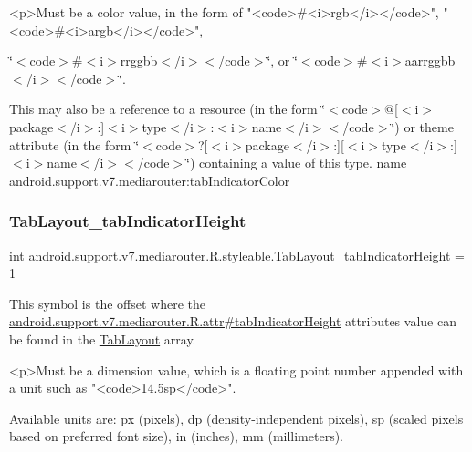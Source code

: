 \begin{DoxyVerb}      <p>Must be a color value, in the form of "<code>#<i>rgb</i></code>", "<code>#<i>argb</i></code>",
\end{DoxyVerb}
 \char`\"{}$<$code$>$\#$<$i$>$rrggbb$<$/i$>$$<$/code$>$\char`\"{}, or \char`\"{}$<$code$>$\#$<$i$>$aarrggbb$<$/i$>$$<$/code$>$\char`\"{}. 

This may also be a reference to a resource (in the form \char`\"{}$<$code$>$@\mbox{[}$<$i$>$package$<$/i$>$\+:\mbox{]}$<$i$>$type$<$/i$>$\+:$<$i$>$name$<$/i$>$$<$/code$>$\char`\"{}) or theme attribute (in the form \char`\"{}$<$code$>$?\mbox{[}$<$i$>$package$<$/i$>$\+:\mbox{]}\mbox{[}$<$i$>$type$<$/i$>$\+:\mbox{]}$<$i$>$name$<$/i$>$$<$/code$>$\char`\"{}) containing a value of this type.  name android.\+support.\+v7.\+mediarouter\+:tab\+Indicator\+Color \mbox{\label{classandroid_1_1support_1_1v7_1_1mediarouter_1_1R_1_1styleable_a4886393baa84ceeef094b8f894bb3d42}} 
\subsubsection{\texorpdfstring{Tab\+Layout\+\_\+tab\+Indicator\+Height}{TabLayout\_tabIndicatorHeight}}
{\footnotesize\ttfamily int android.\+support.\+v7.\+mediarouter.\+R.\+styleable.\+Tab\+Layout\+\_\+tab\+Indicator\+Height = 1\hspace{0.3cm}{\ttfamily [static]}}

This symbol is the offset where the \hyperlink{classandroid_1_1support_1_1v7_1_1mediarouter_1_1R_1_1attr_a6e43238d9de23b53c1c96f5fae8205d7}{android.\+support.\+v7.\+mediarouter.\+R.\+attr\#tab\+Indicator\+Height} attribute\textquotesingle{}s value can be found in the \hyperlink{classandroid_1_1support_1_1v7_1_1mediarouter_1_1R_1_1styleable_a94de1350e0a902b4a974d775f2f4f25e}{Tab\+Layout} array.

\begin{DoxyVerb}      <p>Must be a dimension value, which is a floating point number appended with a unit such as "<code>14.5sp</code>".
\end{DoxyVerb}
 Available units are\+: px (pixels), dp (density-\/independent pixels), sp (scaled pixels based on preferred font size), in (inches), mm (millimeters). 

